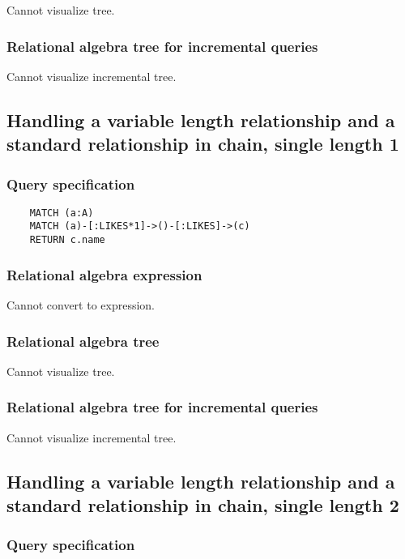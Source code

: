 	Cannot visualize tree.

	\subsubsection*{Relational algebra tree for incremental queries}

	Cannot visualize incremental tree.
	\subsection{Handling a variable length relationship and a standard relationship in chain, single length 1}

	\subsubsection*{Query specification}

	\begin{lstlisting}
	MATCH (a:A)
	MATCH (a)-[:LIKES*1]->()-[:LIKES]->(c)
	RETURN c.name
	\end{lstlisting}


	\subsubsection*{Relational algebra expression}

	Cannot convert to expression.

	\subsubsection*{Relational algebra tree}

	Cannot visualize tree.

	\subsubsection*{Relational algebra tree for incremental queries}

	Cannot visualize incremental tree.
	\subsection{Handling a variable length relationship and a standard relationship in chain, single length 2}

	\subsubsection*{Query specification}

